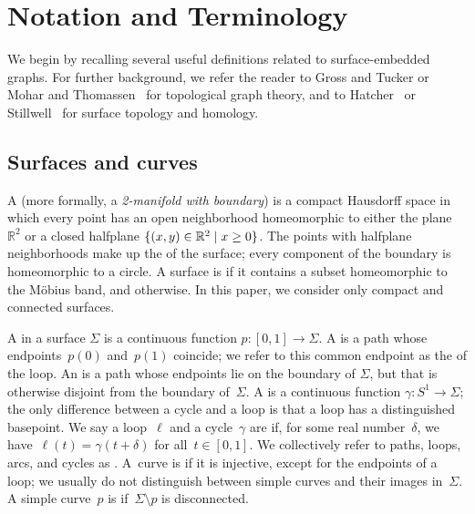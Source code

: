 \documentclass[letterpaper,review]{siamart190516}
\def\Real{\mathbb{R}}
\def\anote#1{\color{purple}Amir: #1 \color{black}}
\begin{document}
\section{Notation and Terminology}
\label{sec:prelims}

We begin by recalling several useful definitions related to surface-embedded graphs.  For further background, we refer the reader to Gross and Tucker \cite{gt-tgt-01} or Mohar and Thomassen~\cite{mt-gs-01} for topological graph theory, and to Hatcher~\cite{h-at-02} or Stillwell~\cite{s-ctcgt-93} for surface topology and homology.

\subsection{Surfaces and curves}
\label{SS:surfaces}

A  (more formally, a \emph{2-manifold with boundary}) is a compact Hausdorff space in which every point has an open neighborhood homeomorphic to either the plane $\Real^2$ or a closed halfplane $\set{(x,y)\in \Real^2\mid x\ge 0}$.  The points with halfplane neighborhoods make up the  of the surface; every component of the boundary is homeomorphic to a circle.
A surface is  if it contains a subset homeomorphic to
the Möbius band, and  otherwise.  In this paper, we consider only compact and connected surfaces.

A  in a surface $\Sigma$ is a continuous function $p\colon [0,1]\to\Sigma$.
A  is a path whose endpoints~$p(0)$ and~$p(1)$ coincide;
we refer to this common endpoint as the  of the loop.
An  is a path whose endpoints lie on the boundary of $\Sigma$, but that is otherwise disjoint from the boundary of~$\Sigma$.
A  is a continuous function $\gamma\colon S^1\to\Sigma$;
the only difference between a cycle and a loop is that a loop has a
distinguished basepoint.
We say a loop~$\ell$ and a cycle~$\gamma$ are  if, for some
real number~$\delta$, we have~$\ell(t) = \gamma(t + \delta)$ for
all~$t \in [0,1]$.
We collectively refer to paths, loops, arcs, and cycles as .
A~curve is  if it is injective, except for the endpoints of a loop; we usually do not distinguish between simple curves and their images in~$\Sigma$.
A simple curve~$p$ is  if~$\Sigma \setminus p$ is disconnected.
\end{document}
